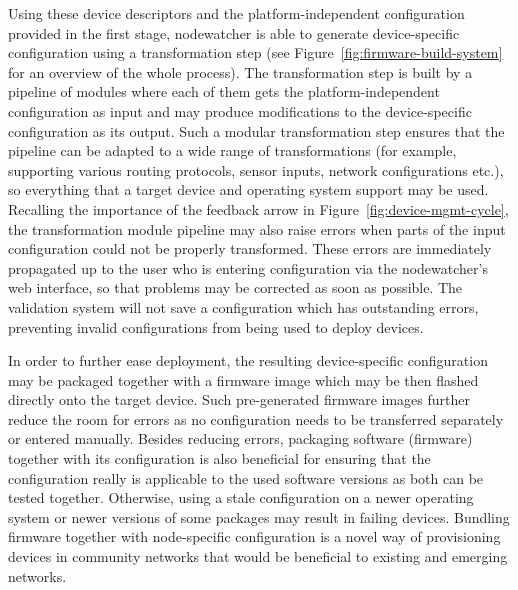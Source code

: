 \documentclass[5p,sort&compress]{elsarticle}
\begin{document}
Using these device descriptors and the platform-independent configuration provided in the first stage, nodewatcher is able to generate device-specific configuration using a transformation step (see Figure~\ref{fig:firmware-build-system} for an overview of the whole process).
The transformation step is built by a pipeline of modules where each of them gets the platform-independent configuration as input and may produce modifications to the device-specific configuration as its output.
Such a modular transformation step ensures that the pipeline can be adapted to a wide range of transformations (for example, supporting various routing protocols, sensor inputs, network configurations etc.), so everything that a target device and operating system support may be used.
Recalling the importance of the feedback arrow in Figure~\ref{fig:device-mgmt-cycle}, the transformation module pipeline may also raise errors when parts of the input configuration could not be properly transformed.
These errors are immediately propagated up to the user who is entering configuration via the nodewatcher's web interface, so that problems may be corrected as soon as possible.
The validation system will not save a configuration which has outstanding errors, preventing invalid configurations from being used to deploy devices.

In order to further ease deployment, the resulting device-specific configuration may be packaged together with a firmware image which may be then flashed directly onto the target device.
Such pre-generated firmware images further reduce the room for errors as no configuration needs to be transferred separately or entered manually.
Besides reducing errors, packaging software (firmware) together with its configuration is also beneficial for ensuring that the configuration really is applicable to the used software versions as both can be tested together.
Otherwise, using a stale configuration on a newer operating system or newer versions of some packages may result in failing devices.
Bundling firmware together with node-specific configuration is a novel way of provisioning devices in community networks  that would be beneficial to existing and emerging networks.
\end{document}
